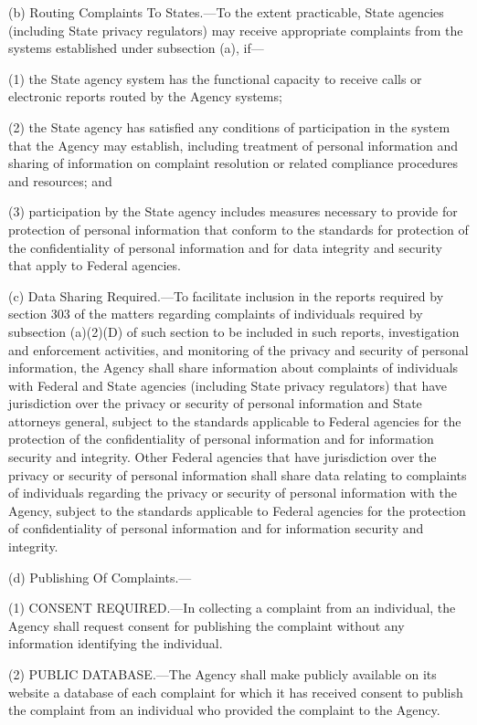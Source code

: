 (b) Routing Complaints To States.—To the extent practicable, State agencies (including State privacy regulators) may receive appropriate complaints from the systems established under subsection (a), if—

(1) the State agency system has the functional capacity to receive calls or electronic reports routed by the Agency systems;

(2) the State agency has satisfied any conditions of participation in the system that the Agency may establish, including treatment of personal information and sharing of information on complaint resolution or related compliance procedures and resources; and

(3) participation by the State agency includes measures necessary to provide for protection of personal information that conform to the standards for protection of the confidentiality of personal information and for data integrity and security that apply to Federal agencies.

(c) Data Sharing Required.—To facilitate inclusion in the reports required by section 303 of the matters regarding complaints of individuals required by subsection (a)(2)(D) of such section to be included in such reports, investigation and enforcement activities, and monitoring of the privacy and security of personal information, the Agency shall share information about complaints of individuals with Federal and State agencies (including State privacy regulators) that have jurisdiction over the privacy or security of personal information and State attorneys general, subject to the standards applicable to Federal agencies for the protection of the confidentiality of personal information and for information security and integrity. Other Federal agencies that have jurisdiction over the privacy or security of personal information shall share data relating to complaints of individuals regarding the privacy or security of personal information with the Agency, subject to the standards applicable to Federal agencies for the protection of confidentiality of personal information and for information security and integrity.

(d) Publishing Of Complaints.—

(1) CONSENT REQUIRED.—In collecting a complaint from an individual, the Agency shall request consent for publishing the complaint without any information identifying the individual.

(2) PUBLIC DATABASE.—The Agency shall make publicly available on its website a database of each complaint for which it has received consent to publish the complaint from an individual who provided the complaint to the Agency.

